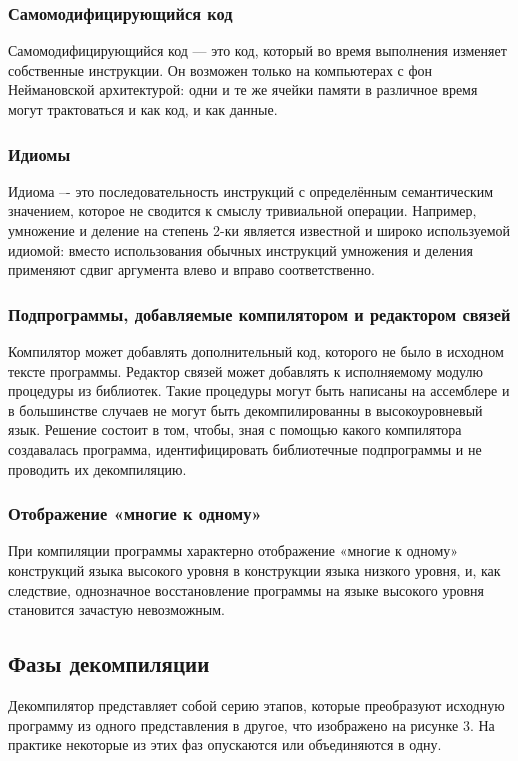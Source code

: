 \documentclass[14pt]{extarticle}
\begin{document}
\subsubsection*{Самомодифицирующийся код}
Самомодифицирующийся код --- это код, который во время выполнения изменяет собственные инструкции. Он возможен только на компьютерах с фон Неймановской архитектурой: одни и те же ячейки памяти в различное время могут трактоваться и как код, и как данные.
\subsubsection*{Идиомы}
Идиома –- это последовательность инструкций с определённым семантическим значением, которое не сводится к смыслу тривиальной операции. Например, умножение и деление на степень 2-ки является известной и широко используемой идиомой: вместо использования обычных инструкций умножения и деления применяют сдвиг аргумента влево и вправо соответственно.

\newpage
\subsubsection*{Подпрограммы, добавляемые компилятором и редактором связей}
Компилятор может добавлять дополнительный код, которого не было в исходном тексте программы. Редактор связей может добавлять к исполняемому модулю процедуры из библиотек. Такие процедуры могут быть написаны на ассемблере и в большинстве случаев не могут быть декомпилированны в высокоуровневый язык. Решение состоит в том, чтобы, зная с помощью какого компилятора создавалась программа, идентифицировать библиотечные подпрограммы и не проводить их декомпиляцию.
\subsubsection*{Отображение «многие к одному»}
При компиляции программы характерно отображение «многие к одному» конструкций языка высокого уровня в конструкции языка низкого уровня, и, как следствие, однозначное восстановление программы на языке высокого уровня становится зачастую невозможным.

\pagebreak

\subsection{Фазы декомпиляции}

Декомпилятор представляет собой серию этапов, которые преобразуют исходную программу из одного представления в другое, что изображено на рисунке 3. На практике некоторые из этих фаз опускаются или объединяются в одну\cite{sheglov}.
\end{document}
